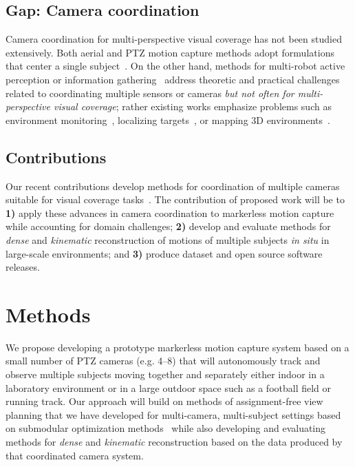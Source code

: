 \documentclass[11pt]{article}
\begin{document}
\subsection{Gap: Camera coordination}

Camera coordination for multi-perspective visual coverage has not been
studied extensively.
Both aerial and PTZ motion capture methods adopt
formulations that center a single
subject~\citep{ho2021iros,saini2022ral,saini2019iccv,hong2024eccv,zhou2018icra,bachmann20193dv,yamamoto2022visigrapp}.
On the other hand, methods for multi-robot active perception or information
gathering~\citep{singh2009,corah2019auro,atanasov2015icra} address theoretic and
practical challenges related to coordinating multiple sensors or cameras
\emph{but not often for multi-perspective visual coverage};
rather existing works emphasize problems such as
environment monitoring~\citep{singh2009},
localizing targets~\cite{atanasov2015icra}, or
mapping 3D environments~\citep{corah2019auro}.

\subsection{Contributions}

Our recent contributions develop methods for coordination of multiple cameras
suitable for visual coverage
tasks~\citep{hughes2024cdc,suresh2024iros,bouy2026}.
The contribution of proposed work will be to
\textbf{1)} apply these advances in camera coordination to markerless
motion capture while accounting for domain challenges;
\textbf{2)} develop and evaluate methods for \emph{dense} and
\emph{kinematic} reconstruction of motions of multiple subjects \emph{in situ}
in large-scale environments; and
\textbf{3)} produce dataset and open source software releases.

\section{Methods}

We propose developing a prototype markerless motion capture system based on a small number
of PTZ cameras (e.g. 4--8) that will autonomously track and observe
multiple subjects moving together and separately either indoor in a laboratory
environment or in a large outdoor space such as a football field or running
track.
Our approach will build on methods of assignment-free view
planning that we have developed for multi-camera, multi-subject settings
based on submodular optimization
methods~\citep{suresh2024iros,hughes2024cdc,bouy2026}
while also developing and evaluating methods for \emph{dense} and
\emph{kinematic} reconstruction based on the data produced by that coordinated
camera system.
\end{document}
